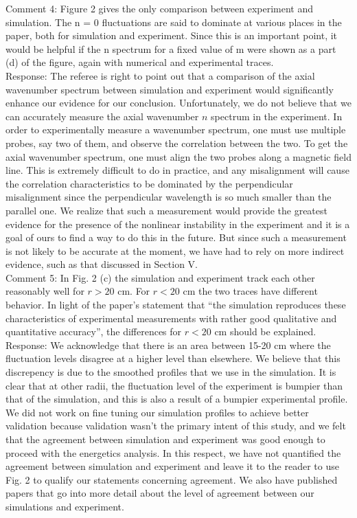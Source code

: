 \documentclass[12pt]{article}
\begin{document}
Comment 4:   Figure 2 gives the only comparison between experiment and simulation. The n = 0
fluctuations are said to dominate at various places in the paper, both for simulation and
experiment. Since this is an important point, it would be helpful if the n spectrum for a
fixed value of m were shown as a part (d) of the figure, again with numerical and
experimental traces. \\

Response: The referee is right to point out that a comparison of the axial wavenumber spectrum between simulation and experiment would significantly enhance our evidence for our conclusion.
Unfortunately, we do not believe that we can accurately measure the axial wavenumber $n$ spectrum in the experiment. In order to experimentally measure a wavenumber spectrum, one must
use multiple probes, say two of them, and observe the correlation between the two. To get the axial wavenumber spectrum, one must align the two probes along a magnetic field line.
This is extremely difficult to do in practice, and any misalignment will cause the correlation characteristics to be dominated by the perpendicular misalignment since the perpendicular
wavelength is so much smaller than the parallel one. We realize that such a measurement would provide the greatest
evidence for the presence of the nonlinear instability in the experiment and it is a goal of ours to find a way to do this in the future. 
But since such a measurement is not likely to be accurate at the moment, we have had to rely on more indirect evidence, such as that discussed in Section V. \\
   

Comment 5: In Fig. 2 (c) the simulation and experiment track each other reasonably well for $r > 20$
cm. For $r < 20$ cm the two traces have different behavior. In light of the paper’s
statement that “the simulation reproduces these characteristics of experimental
measurements with rather good qualitative and quantitative accuracy”, the differences for
$r < 20$ cm should be explained. \\

Response: We acknowledge that there is an area between 15-20 cm where the fluctuation levels disagree at a higher level than elsewhere. We believe that this discrepency is due to the smoothed
profiles that we use in the simulation. It is clear that at other radii, the fluctuation level of the experiment is bumpier than that of the simulation, and this is also a result
of a bumpier experimental profile. We did not work on fine tuning our simulation profiles to achieve better validation because validation wasn't the primary intent of this study,
and we felt that the agreement between simulation and experiment was good enough to proceed with the energetics analysis. In this respect, we have not quantified the agreement between 
simulation and experiment and leave it to the reader to use Fig. 2 to qualify our statements concerning agreement. We also have published papers that go into more detail about the level
of agreement between our simulations and experiment. \\
\end{document}
